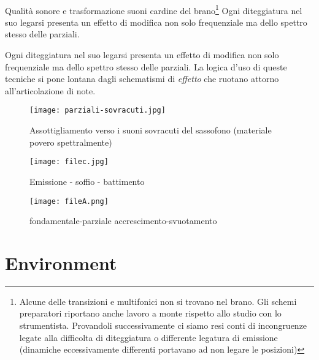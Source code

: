 \clearpage

~

\clearpage





Qualità sonore e trasformazione suoni cardine del brano\footnote{Alcune delle transizioni
e multifonici non si trovano nel brano. Gli schemi preparatori riportano anche lavoro a
monte rispetto allo studio con lo strumentista.  Provandoli successivamente ci siamo
resi conti di incongruenze legate alla difficolta di diteggiatura o differente
legatura di emissione (dinamiche eccessivamente differenti portavano ad non legare le posizioni)}
Ogni diteggiatura nel suo legarsi presenta un effetto di modifica non solo
frequenziale ma dello spettro stesso delle parziali.

Ogni diteggiatura nel suo legarsi presenta un effetto di modifica non solo frequenziale ma
dello spettro stesso delle parziali. La logica d'uso di queste tecniche si pone
lontana dagli schematismi di \emph{effetto} che ruotano attorno all'articolazione di note.

\vfill

\begin{figure}[h]
\centering
{\texttt{[image: parziali-sovracuti.jpg]}}
\caption[Assottigliamento verso i suoni sovracuti]{Assottigliamento verso i suoni sovracuti del sassofono (materiale povero spettralmente)}
\label{fig:assottiglimento}
\end{figure}

\vfill

\begin{figure}[h]
\centering
{\texttt{[image: filec.jpg]}}
\caption[Emissione - soffio - battimento]{Emissione - soffio - battimento}
\label{fig:soffio}
\end{figure}

\vfill

\begin{figure}[h]
\centering
{\texttt{[image: fileA.png]}}
\caption[Passaggio microtonale]{fondamentale-parziale accrescimento-svuotamento}
\label{fig:microtoni}
\end{figure}

\section{Environment}


